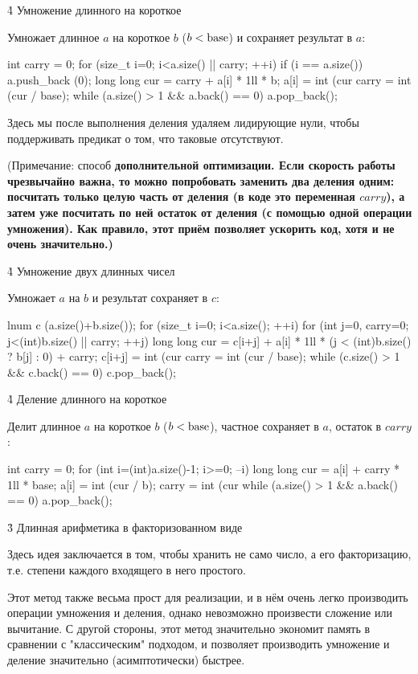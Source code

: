 \h4{ Умножение длинного на короткое }

Умножает длинное $a$ на короткое $b$ ($b < {\rm base}$) и сохраняет результат в $a$:

\code
int carry = 0;
for (size_t i=0; i<a.size() || carry; ++i) {
	if (i == a.size())
		a.push_back (0);
	long long cur = carry + a[i] * 1ll * b;
	a[i] = int (cur %
	carry = int (cur / base);
}
while (a.size() > 1 && a.back() == 0)
	a.pop_back();
\endcode

Здесь мы после выполнения деления удаляем лидирующие нули, чтобы поддерживать предикат о том, что таковые отсутствуют.

(Примечание: способ \bf{дополнительной оптимизации}. Если скорость работы чрезвычайно важна, то можно попробовать заменить два деления одним: посчитать только целую часть от деления (в коде это переменная $carry$), а затем уже посчитать по ней остаток от деления (с помощью одной операции умножения). Как правило, этот приём позволяет ускорить код, хотя и не очень значительно.)


\h4{ Умножение двух длинных чисел }

Умножает $a$ на $b$ и результат сохраняет в $c$:

\code
lnum c (a.size()+b.size());
for (size_t i=0; i<a.size(); ++i)
	for (int j=0, carry=0; j<(int)b.size() || carry; ++j) {
		long long cur = c[i+j] + a[i] * 1ll * (j < (int)b.size() ? b[j] : 0) + carry;
		c[i+j] = int (cur %
		carry = int (cur / base);
	}
while (c.size() > 1 && c.back() == 0)
	c.pop_back();
\endcode


\h4{ Деление длинного на короткое }

Делит длинное $a$ на короткое $b$ ($b < {\rm base}$), частное сохраняет в $a$, остаток в $carry$:

\code
int carry = 0;
for (int i=(int)a.size()-1; i>=0; --i) {
	long long cur = a[i] + carry * 1ll * base;
	a[i] = int (cur / b);
	carry = int (cur %
}
while (a.size() > 1 && a.back() == 0)
	a.pop_back();
\endcode


\h3{ Длинная арифметика в факторизованном виде }

Здесь идея заключается в том, чтобы хранить не само число, а его факторизацию, т.е. степени каждого входящего в него простого.

Этот метод также весьма прост для реализации, и в нём очень легко производить операции умножения и деления, однако невозможно произвести сложение или вычитание. С другой стороны, этот метод значительно экономит память в сравнении с "классическим" подходом, и позволяет производить умножение и деление значительно (асимптотически) быстрее.

